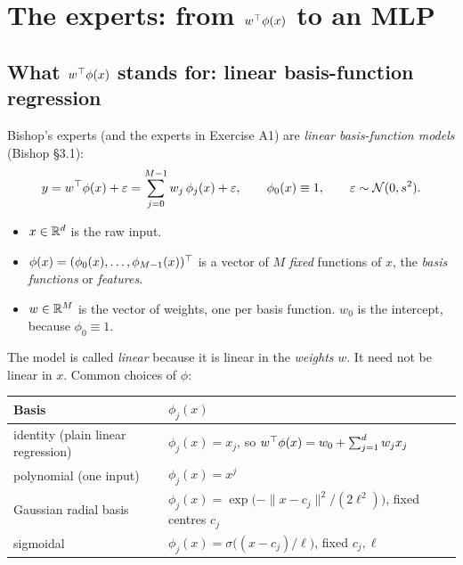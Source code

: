 \section{The experts: from $w^{\top}\phi(x)$ to an MLP}

\subsection{What $w^{\top}\phi(x)$ stands for: linear basis-function regression}

Bishop's experts (and the experts in Exercise A1) are \emph{linear basis-function models} (Bishop \S3.1):
\begin{equation}\label{eq:basis}
y = w^{\top}\phi(x) + \varepsilon = \sum_{j=0}^{M-1} w_j\,\phi_j(x) + \varepsilon,\qquad \phi_0(x)\equiv 1,\qquad \varepsilon\sim\mathcal{N}(0,s^2).
\end{equation}
\begin{itemize}
  \item $x\in\mathbb{R}^d$ is the raw input.
  \item $\phi(x)=(\phi_0(x),\dots,\phi_{M-1}(x))^{\top}$ is a vector of $M$ \emph{fixed} functions of $x$, the \emph{basis functions} or \emph{features}.
  \item $w\in\mathbb{R}^M$ is the vector of weights, one per basis function. $w_0$ is the intercept, because $\phi_0\equiv1$.
\end{itemize}
The model is called \emph{linear} because it is linear in the \emph{weights} $w$. It need not be linear in $x$. Common choices of $\phi$:

\begin{center}
\renewcommand{\arraystretch}{1.25}
\begin{tabular}{@{}ll@{}}
\toprule
Basis & $\phi_j(x)$ \\
\midrule
identity (plain linear regression) & $\phi_j(x)=x_j$, so $w^{\top}\phi(x)=w_0+\sum_{j=1}^d w_jx_j$ \\
polynomial (one input) & $\phi_j(x)=x^j$ \\
Gaussian radial basis & $\phi_j(x)=\exp\!\big(-\|x-c_j\|^2/(2\ell^2)\big)$, fixed centres $c_j$ \\
sigmoidal & $\phi_j(x)=\sigma\big((x-c_j)/\ell\big)$, fixed $c_j,\ell$ \\
\bottomrule
\end{tabular}
\end{center}

